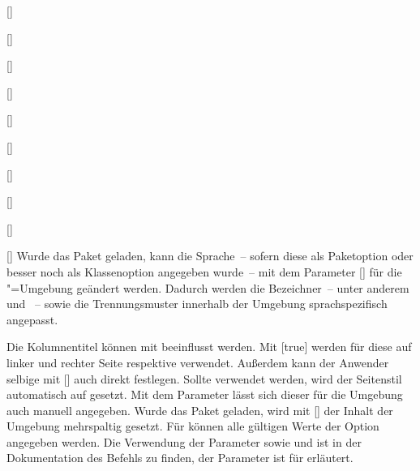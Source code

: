 \begin{Declaration}[v2.02]{[\LParameter]}
\begin{Declaration}{[]}
\begin{Declaration}[v2.02]{%
  []%
}
\begin{Declaration}[v2.02]{%
  []%
}
\begin{Declaration}[v2.02]{%
  []%
}
\begin{Declaration}{[\PSet]}
\begin{Declaration}{%
  []
}
\begin{Declaration}{[]}
\begin{Declaration}{[]}
\begin{Declaration}{[]}
Wurde das Paket  geladen, kann die Sprache~-- sofern diese als 
Paketoption oder besser noch als Klassenoption angegeben wurde~-- mit dem 
Parameter [] für die 
"=Umgebung geändert werden. Dadurch werden die 
Bezeichner~-- unter anderem  und ~-- 
sowie die Trennungsmuster innerhalb der Umgebung sprachspezifisch angepasst. 

Die Kolumnentitel können mit  
beeinflusst werden. Mit [true] werden 
für diese auf linker und rechter Seite  respektive 
 verwendet. Außerdem kann der Anwender selbige mit 
[] auch direkt 
festlegen. Sollte  verwendet werden, 
wird der Seitenstil automatisch auf  gesetzt. Mit dem 
Parameter  lässt sich dieser für die 
Umgebung auch manuell angegeben. Wurde das Paket  geladen, 
wird mit [] der Inhalt 
der Umgebung mehrspaltig gesetzt. Für  
können alle gültigen Werte der Option  angegeben werden. 
Die Verwendung der Parameter  sowie
 und  ist 
in der Dokumentation des Befehls  zu finden, der Parameter 
 ist für  erläutert. 
\end{Declaration}
\end{Declaration}
\end{Declaration}
\end{Declaration}
\end{Declaration}
\end{Declaration}
\end{Declaration}
\end{Declaration}
\end{Declaration}
\end{Declaration}

